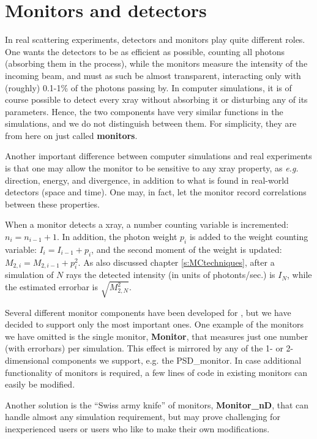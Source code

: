\chapter{Monitors and detectors}

In real scattering experiments, detectors and monitors play quite
different roles. One wants the detectors to be as efficient as
possible, counting all photons (absorbing them in the process),
while the monitors measure the intensity of the incoming beam, and must
as such be almost transparent, interacting only with (roughly) 0.1-1\%
of the photons passing by. In computer simulations, it is
of course possible to detect every xray without
absorbing it or disturbing any of its parameters. Hence, the two components
have very similar functions in the simulations, and we do
not distinguish between them. For simplicity, they are from here on
just called {\bf monitors}.

Another important difference between computer simulations
and real experiments is
that one may allow the monitor to be sensitive to any xray property,
as {\em e.g.} direction, energy, and divergence, in addition to what
is found in real-world detectors (space and time). One may, in
fact, let the monitor    record correlations between these properties.

When a monitor detects a xray,
a number counting variable is incremented: $n_i = n_{i-1}+1$.
In addition, the photon
weight $p_i$ is added to the weight counting variable:
$I_i = I_{i-1} + p_i$,
and the second moment of the weight is
updated: $M_{2,i} = M_{2,i-1} + p_i^2$.
As also discussed chapter \ref{s:MCtechniques}, after a simulation of $N$ rays
the detected intensity (in units of photonts/sec.) is $I_N$,
while the estimated errorbar is $\sqrt{M_{2,N}^2}$.

Several different monitor components have been developed for
\MCX , but we have decided to support only the most important ones.
One example of the monitors we have omitted is the single monitor,
{\bf Monitor},
that measures just one number (with errorbars) per simulation.
This effect is mirrored by any of the 1- or 2-dimensional components
we support, e.g. the {\rm PSD\_monitor}.
In case additional functionality of monitors is required,
a few lines of code in existing monitors can easily be modified.

Another solution is the ``Swiss army knife'' of monitors, {\bf Monitor\_nD}, that can handle
almost any simulation requirement, but may prove challenging for inexperienced users or users who like to make their own modifications.

\newpage
%

%







%

%

\newpage

